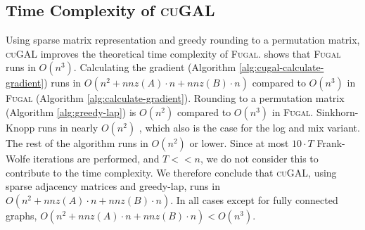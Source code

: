 \subsection{Time Complexity of \textsc{cuGAL}}
Using sparse matrix representation and greedy rounding to a permutation matrix, \textsc{cuGAL} improves the theoretical time complexity of \textsc{Fugal}. \cite{fugal2024} shows that \textsc{Fugal} runs in $O(n^3)$. Calculating the gradient (Algorithm \ref{alg:cugal-calculate-gradient}) runs in $O(n^2 + nnz(A) \cdot n + nnz(B) \cdot n)$ compared to $O(n^3)$ in \textsc{Fugal} (Algorithm \ref{alg:calculate-gradient}). Rounding to a permutation matrix (Algorithm \ref{alg:greedy-lap}) is $O(n^2)$ compared to $O(n^3)$ in \textsc{Fugal}. Sinkhorn-Knopp runs in nearly $O(n^2)$ \citep{cuturi2013sinkhorn}, which also is the case for the log and mix variant. The rest of the algorithm runs in $O(n^2)$ or lower. Since at most $10 \cdot T$ Frank-Wolfe iterations are performed, and $T << n$, we do not consider this to contribute to the time complexity.  We therefore conclude that \textsc{cuGAL}, using sparse adjacency matrices and greedy-lap, runs in $O(n^2 + nnz(A) \cdot n + nnz(B) \cdot n)$. In all cases except for fully connected graphs,  $O(n^2 + nnz(A) \cdot n + nnz(B) \cdot n) < O(n^3)$.
